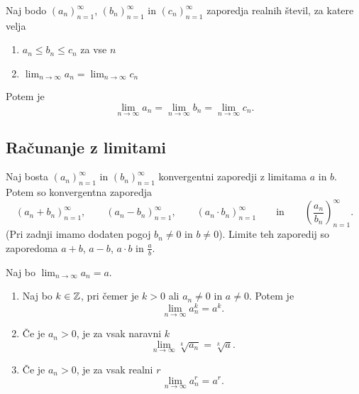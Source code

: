 \documentclass[12pt, a4paper]{article}
\begin{document}
\obvs

\begin{izrek}[O sendviču]
Naj bodo $(a_n)_{n=1}^\infty$, $(b_n)_{n=1}^\infty$ in $(c_n)_{n=1}^\infty$ zaporedja realnih števil, za katere velja

\begin{enumerate}[label=\roman*)]
\item $a_n\leq b_n\leq c_n$ za vse $n$
\item $\displaystyle\lim_{n\to\infty}a_n=\lim_{n\to\infty}c_n$
\end{enumerate}

Potem je
\[
\lim_{n\to\infty}a_n=\lim_{n\to\infty}b_n=\lim_{n\to\infty}c_n.
\]
\end{izrek}

\obvs

\newpage

\subsection{Računanje z limitami}

\begin{izrek}
Naj bosta $(a_n)_{n=1}^\infty$ in $(b_n)_{n=1}^\infty$ konvergentni zaporedji z limitama $a$ in $b$. Potem so konvergentna zaporedja
\[
(a_n+b_n)_{n=1}^\infty,\qquad (a_n-b_n)_{n=1}^\infty,\qquad (a_n\cdot b_n)_{n=1}^\infty\qquad\text{in}\qquad\left(\frac{a_n}{b_n}\right)_{n=1}^\infty.
\]
(Pri zadnji imamo dodaten pogoj $b_n\ne 0$ in $b\ne 0$). Limite teh zaporedij so zaporedoma $a+b$, $a-b$, $a\cdot b$ in $\frac{a}{b}$.
\end{izrek}

\obvs

\begin{posledica}
Naj bo $\displaystyle\lim_{n\to\infty}a_n=a$.

\begin{enumerate}[label=\roman*)]
\item Naj bo $k\in\mathbb{Z}$, pri čemer je $k>0$ ali $a_n\ne 0$ in $a\ne 0$. Potem je
\[
\lim_{n\to\infty}a_n^k=a^k.
\]
\item Če je $a_n>0$, je za vsak naravni $k$
\[
\lim_{n\to\infty}\sqrt[k]{a_n}=\sqrt[k]{a}.
\]
\item Če je $a_n>0$, je za vsak realni $r$
\[
\lim_{n\to\infty}a_n^r=a^r.
\]
\end{enumerate}
\end{posledica}
\end{document}
